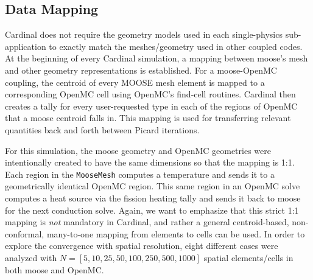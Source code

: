 \documentclass[letterpaper]{mc2023}
\begin{document}
\subsection{Data Mapping}
Cardinal does not require the geometry models used in each single-physics sub-application to exactly match the meshes/geometry used in
other coupled codes. At the beginning of every Cardinal simulation, a mapping between \gls{moose}'s mesh and other geometry representations
is established. For a \gls{moose}-OpenMC coupling, the centroid of every MOOSE mesh element is mapped to a corresponding OpenMC cell using
OpenMC's find-cell routines. Cardinal then creates a tally for every user-requested type in each of the regions of OpenMC that a \gls{moose}
centroid falls in. This mapping is used for transferring relevant quantities back and forth between Picard iterations. 

For this simulation, the \gls{moose} geometry and OpenMC geometries were intentionally created to have the same dimensions so that the
mapping is 1:1. Each region in the \texttt{MooseMesh} computes a temperature and sends it to a geometrically identical OpenMC region.
This same region in an OpenMC solve computes a heat source via the fission heating tally and sends it back to \gls{moose} for the next
conduction solve. Again, we want to emphasize that this strict 1:1 mapping is {\it not} mandatory in Cardinal, and rather a general
centroid-based, non-conformal, many-to-one mapping from elements to cells can be used. In order to explore the convergence with spatial
resolution, eight different cases were analyzed with $N=[5, 10, 25, 50, 100, 250, 500, 1000]$ spatial elements/cells in both \gls{moose}
and OpenMC.
\end{document}
